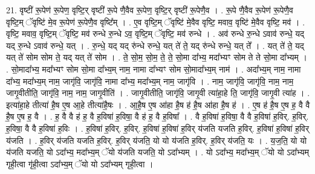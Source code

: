 \documentclass[17pt]{extarticle}
\begin{document}
21. वृष्टी॑ रू॒पेण॑ रू॒पेण॒ वृष्टि॒र् वृष्टी॑ रू॒पे णै॒वैव रू॒पेण॒ वृष्टि॒र् वृष्टी॑ रू॒पेणै॒व । . रू॒पे णै॒वैव रू॒पेण॑ रू॒पेणै॒व वृष्टि॒म् ॅवृष्टि॑ मे॒व रू॒पेण॑ रू॒पेणै॒व वृष्टि᳚म् । . ए॒व वृष्टि॒म् ॅवृष्टि॑ मे॒वैव वृष्टि॒ मवाव॒ वृष्टि॑ मे॒वैव वृष्टि॒ मव॑ । . वृष्टि॒ मवाव॒ वृष्टि॒म् ॅवृष्टि॒ मव॑ रुन्धे रु॒न्धे ऽव॒ वृष्टि॒म् ॅवृष्टि॒ मव॑ रुन्धे । . अव॑ रुन्धे रु॒न्धे ऽवाव॑ रुन्धे॒ यद् यद् रु॒न्धे ऽवाव॑ रुन्धे॒ यत् । . रु॒न्धे॒ यद् यद् रु॑न्धे रुन्धे॒ यत् ते॑ ते॒ यद् रु॑न्धे रुन्धे॒ यत् ते᳚ । . यत् ते॑ ते॒ यद् यत् ते॑ सोम सोम ते॒ यद् यत् ते॑ सोम । . ते॒ सो॒म॒ सो॒म॒ ते॒ ते॒ सो॒मा दा᳚भ्य॒ मदा᳚भ्यꣳ सोम ते ते सो॒मा दा᳚भ्यम् । . सो॒मादा᳚भ्य॒ मदा᳚भ्यꣳ सोम सो॒मा दा᳚भ्य॒म् नाम॒ नामा दा᳚भ्यꣳ सोम सो॒मादा᳚भ्य॒म् नाम॑ । . अदा᳚भ्य॒म् नाम॒ नामा दा᳚भ्य॒ मदा᳚भ्य॒म् नाम॒ जागृ॑वि॒ जागृ॑वि॒ नामा दा᳚भ्य॒ मदा᳚भ्य॒म् नाम॒ जागृ॑वि । . नाम॒ जागृ॑वि॒ जागृ॑वि॒ नाम॒ नाम॒ जागृ॒वीतीति॒ जागृ॑वि॒ नाम॒ नाम॒ जागृ॒वीति॑ । . जागृ॒वीतीति॒ जागृ॑वि॒ जागृ॒वी त्या॑हा॒हे ति॒ जागृ॑वि॒ जागृ॒वी त्या॑ह । . इत्या॑हा॒हे तीत्या॑ है॒ष ए॒ष आ॒हे तीत्या॑है॒षः । . आ॒है॒ष ए॒ष आ॑हा है॒ष ह॑ है॒ष आ॑हा है॒ष ह॑ । . ए॒ष ह॑ है॒ष ए॒ष ह॒ वै वै है॒ष ए॒ष ह॒ वै । . ह॒ वै वै ह॑ ह॒ वै ह॒विषा॑ ह॒विषा॒ वै ह॑ ह॒ वै ह॒विषा᳚ । . वै ह॒विषा॑ ह॒विषा॒ वै वै ह॒विषा॑ ह॒विर्. ह॒विर्. ह॒विषा॒ वै वै ह॒विषा॑ ह॒विः । . ह॒विषा॑ ह॒विर्. ह॒विर्. ह॒विषा॑ ह॒विषा॑ ह॒विर् य॑जति यजति ह॒विर्. ह॒विषा॑ ह॒विषा॑ ह॒विर् य॑जति । . ह॒विर् य॑जति यजति ह॒विर्. ह॒विर् य॑जति॒ यो यो य॑जति ह॒विर्. ह॒विर् य॑जति॒ यः । . य॒ज॒ति॒ यो यो य॑जति यजति॒ यो ऽदा᳚भ्य॒ मदा᳚भ्य॒म् ॅयो य॑जति यजति॒ यो ऽदा᳚भ्यम् । . यो ऽदा᳚भ्य॒ मदा᳚भ्य॒म् ॅयो यो ऽदा᳚भ्यम् गृही॒त्वा गृ॑ही॒त्वा ऽदा᳚भ्य॒म् ॅयो यो ऽदा᳚भ्यम् गृही॒त्वा । \newline
\end{document}
